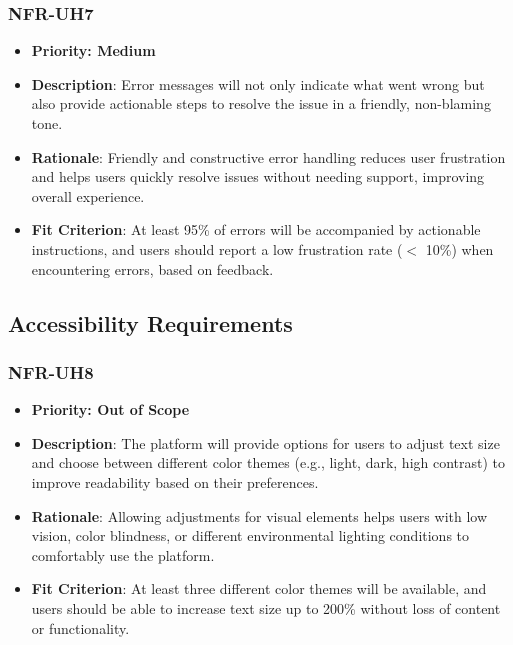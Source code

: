 \documentclass[12pt]{article}
\begin{document}
        \subsubsection*{NFR-UH7} 
        \label{sec:UH7}
        \begin{itemize} 
          \item \textbf{Priority: Medium}
            \item \textbf{Description}: Error messages will not only indicate what went wrong but also provide actionable steps to resolve the issue in a friendly, non-blaming tone.  
            \item \textbf{Rationale}: Friendly and constructive error handling reduces user frustration and helps users quickly resolve issues without needing support, improving overall experience.  
            \item \textbf{Fit Criterion}: At least 95\% of errors will be accompanied by actionable instructions, and users should report a low frustration rate ($<$ 10\%) when encountering errors, based on feedback.
        \end{itemize}


\subsection{Accessibility Requirements}


\subsubsection*{NFR-UH8} 
\label{sec:UH8}
        \begin{itemize} 
          \item \textbf{Priority: Out of Scope}
            \item \textbf{Description}: The platform will provide options for users to adjust text size and choose between different color themes (e.g., light, dark, high contrast) to improve readability based on their preferences.  
            \item \textbf{Rationale}: Allowing adjustments for visual elements helps users with low vision, color blindness, or different environmental lighting conditions to comfortably use the platform.  
            \item \textbf{Fit Criterion}: At least three different color themes will be available, and users should be able to increase text size up to 200\% without loss of content or functionality.
        \end{itemize}
\end{document}
